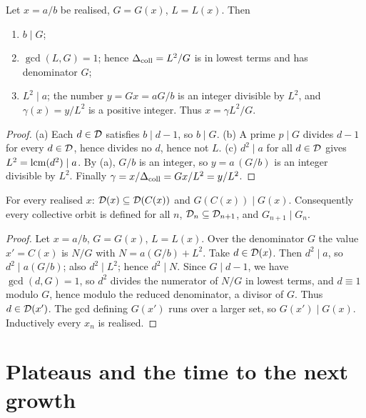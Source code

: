 \begin{proposition}\label{prop:frame}
Let \(x=a/b\) be realised, \(G=G(x)\), \(L=L(x)\). Then
\begin{enumerate}[label=(\alph*),nosep]
\item \(b\mid G\);
\item \(\gcd(L,G)=1\); hence \(\Delta_{\mathrm{coll}}=L^2/G\) is in lowest terms and has denominator \(G\);
\item \(L^2\mid a\); the number \(y=Gx=aG/b\) is an integer divisible by \(L^2\), and \(\gamma(x)=y/L^2\) is a positive integer. Thus \(x=\gamma L^2/G\).
\end{enumerate}
\end{proposition}
\begin{proof}
(a) Each \(d\in\mathcal{D}\) satisfies \(b\mid d-1\), so \(b\mid G\). (b) A prime \(p\mid G\) divides \(d-1\) for every \(d\in\mathcal{D}\), hence divides no \(d\), hence not \(L\). (c) \(d^2\mid a\) for all \(d\in\mathcal{D}\) gives \(L^2=\operatorname{lcm}(d^2)\mid a\). By (a), \(G/b\) is an integer, so \(y=a\,(G/b)\) is an integer divisible by \(L^2\). Finally \(\gamma=x/\Delta_{\mathrm{coll}}=Gx/L^2=y/L^2\).
\end{proof}

\begin{theorem}\label{thm:mono}
For every realised \(x\): \(\mathcal{D}(x)\subseteq\mathcal{D}(C(x))\) and \(G(C(x))\mid G(x)\). Consequently every collective orbit is defined for all \(n\), \(\mathcal{D}_n\subseteq\mathcal{D}_{n+1}\), and \(G_{n+1}\mid G_n\).
\end{theorem}
\begin{proof}
Let \(x=a/b\), \(G=G(x)\), \(L=L(x)\). Over the denominator \(G\) the value \(x'=C(x)\) is \(N/G\) with \(N=a(G/b)+L^2\). Take \(d\in\mathcal{D}(x)\). Then \(d^2\mid a\), so \(d^2\mid a(G/b)\); also \(d^2\mid L^2\); hence \(d^2\mid N\). Since \(G\mid d-1\), we have \(\gcd(d,G)=1\), so \(d^2\) divides the numerator of \(N/G\) in lowest terms, and \(d\equiv1\) modulo \(G\), hence modulo the reduced denominator, a divisor of \(G\). Thus \(d\in\mathcal{D}(x')\). The gcd defining \(G(x')\) runs over a larger set, so \(G(x')\mid G(x)\). Inductively every \(x_n\) is realised.
\end{proof}

\section{Plateaus and the time to the next growth}

